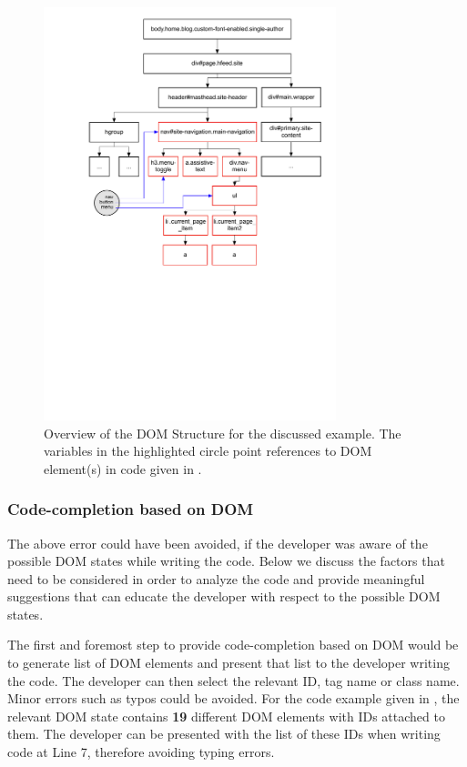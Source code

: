 		
	\begin{figure}
		\centering
		\includegraphics[width=85mm]{images/hierarchy.pdf}
		\caption{Overview of the DOM Structure for the discussed example. The variables in the highlighted circle point references to DOM element(s) in \javascript code given in .}
		\label{Fig:Structure}
	\end{figure}
	
	
	\subsubsection{Code-completion based on DOM}
	\label{Sec:Code-completion}
	The above error could have been avoided, if the developer was aware of the possible DOM states while writing the code. Below we discuss the factors that need to be considered in order to analyze the \javascript code and provide meaningful suggestions that can educate the developer with respect to the possible DOM states.
		
	The first and foremost step to provide code-completion based on DOM would be to generate list of DOM elements and present that list to the developer writing the code. The developer can then select the relevant ID, tag name or class name. Minor errors such as typos could be avoided. For the code example given in , the relevant DOM state contains \textbf{19} different DOM elements with IDs attached to them. The developer can be presented with the list of these IDs when writing code at Line 7, therefore avoiding typing errors.
	
